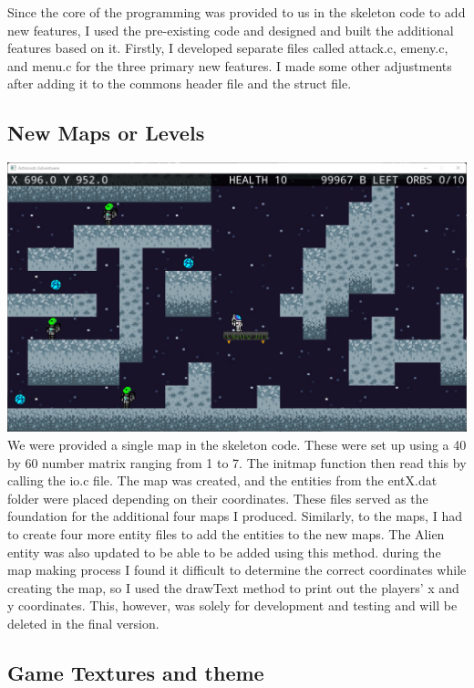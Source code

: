 Since the core of the programming was provided to us in the skeleton code to add new features, I used the pre-existing code and designed and built the additional features based on it. Firstly, I developed separate files called attack.c, emeny.c, and menu.c for the three primary new features. I made some other adjustments after adding it to the commons header file and the struct file. 

\subsection{New Maps or Levels}
\includegraphics[width=1\linewidth]{images/ss.png}
We were provided a single map in the skeleton code. These were set up using a 40 by 60 number matrix ranging from 1 to 7. The initmap function then read this by calling the io.c file. The map was created, and the entities from the entX.dat folder were placed depending on their coordinates.
These files served as the foundation for the additional four maps I produced. Similarly, to the maps, I had to create four more entity files to add the entities to the new maps. The Alien entity was also updated to be able to be added using this method. during the map making process I found it difficult to determine the correct coordinates while creating the map, so I used the drawText method to print out the players' x and y coordinates. This, however, was solely for development and testing and will be deleted in the final version.


\subsection{Game Textures and theme}

